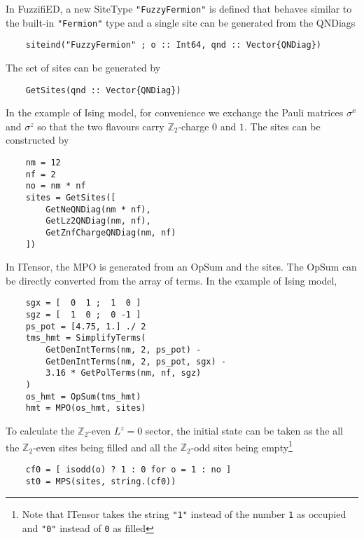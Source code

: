 \documentclass{timesjhep}
\begin{document}
In FuzzifiED, a new SiteType \lstinline|"FuzzyFermion"| is defined that behaves similar to the built-in \lstinline|"Fermion"| type and a single site can be generated from the QNDiags
\begin{lstlisting}
    siteind("FuzzyFermion" ; o :: Int64, qnd :: Vector{QNDiag})
\end{lstlisting}
The set of sites can be generated by 
\begin{lstlisting}
    GetSites(qnd :: Vector{QNDiag})
\end{lstlisting}

In the example of Ising model, for convenience we exchange the Pauli matrices $\sigma^x$ and $\sigma^z$ so that the two flavours carry $\mathbb{Z}_2$-charge $0$ and $1$. The sites can be constructed by 
\begin{lstlisting}
    nm = 12
    nf = 2
    no = nm * nf
    sites = GetSites([
        GetNeQNDiag(nm * nf), 
        GetLz2QNDiag(nm, nf),
        GetZnfChargeQNDiag(nm, nf)
    ])
\end{lstlisting}

In ITensor, the MPO is generated from an OpSum and the sites. The OpSum can be directly converted from the array of terms. In the example of Ising model, 
\begin{lstlisting}
    sgx = [  0  1 ;  1  0 ]
    sgz = [  1  0 ;  0 -1 ]
    ps_pot = [4.75, 1.] ./ 2
    tms_hmt = SimplifyTerms(
        GetDenIntTerms(nm, 2, ps_pot) - 
        GetDenIntTerms(nm, 2, ps_pot, sgx) - 
        3.16 * GetPolTerms(nm, nf, sgz)
    )
    os_hmt = OpSum(tms_hmt)
    hmt = MPO(os_hmt, sites)
\end{lstlisting}

To calculate the $\mathbb{Z}_2$-even $L^z=0$ sector, the initial state can be taken as the all the $\mathbb{Z}_2$-even sites being filled and all the $\mathbb{Z}_2$-odd sites being empty\footnote{Note that ITensor takes the string \lstinline|"1"| instead of the number \lstinline|1| as occupied and \lstinline|"0"| instead of \lstinline|0| as filled}
\begin{lstlisting}
    cf0 = [ isodd(o) ? 1 : 0 for o = 1 : no ]
    st0 = MPS(sites, string.(cf0))
\end{lstlisting}
\end{document}
